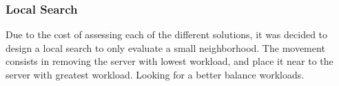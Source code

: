 \subsubsection{Local Search}
Due to the cost of assessing each of the different solutions,
it was decided to design a local search
to only evaluate a small neighborhood.
The movement consists in
removing the server with lowest workload,
and place it near to the server with greatest workload.
Looking for a better balance
workloads.
